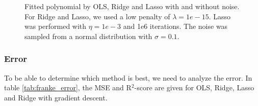 \begin{figure} [H]
	\caption{Fitted polynomial by OLS, Ridge and Lasso with and without noise. For Ridge and Lasso, we used a low penalty of $\lambda=1e-15$. Lasso was performed with $\eta=1e-3$ and 1e6 iterations. The noise was sampled from a normal distribution with $\sigma=0.1$.}%
	\label{fig:franke_plots}%
\end{figure}
\restoregeometry


\subsubsection{Error}
To be able to determine which method is best, we need to analyze the error. In table \eqref{tab:franke_error}, the MSE and R$^2$-score are given for OLS, Ridge, Lasso and Ridge with gradient descent. 

